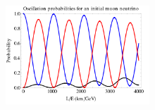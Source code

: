 \begin{figure}
\vspace{-20pt}
  \begin{center}
    \includegraphics[width=0.48\textwidth]{figures/Neutrino_osc.png}
  \end{center}
\vspace{-30pt}
\end{figure}

